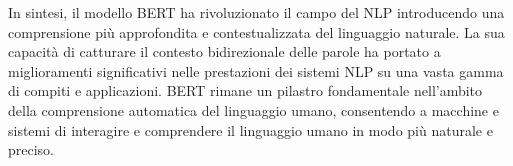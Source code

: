 \documentclass[../../Thesis.tex]{subfiles}
\begin{document}
In sintesi, il modello BERT ha rivoluzionato il campo del NLP introducendo una comprensione più approfondita e contestualizzata del linguaggio naturale. La sua capacità di catturare il contesto bidirezionale delle parole ha portato a miglioramenti significativi nelle prestazioni dei sistemi NLP su una vasta gamma di compiti e applicazioni. BERT rimane un pilastro fondamentale nell'ambito della comprensione automatica del linguaggio umano, consentendo a macchine e sistemi di interagire e comprendere il linguaggio umano in modo più naturale e preciso.
\end{document}
